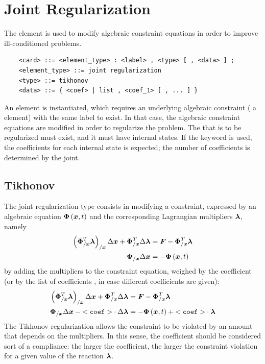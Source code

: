 \section{Joint Regularization}
The  element is used to modify
algebraic constraint equations in order to improve ill-conditioned
problems.

\begin{verbatim}
    <card> ::= <element_type> : <label> , <type> [ , <data> ] ;
    <element_type> ::= joint regularization
    <type> ::= tikhonov
    <data> ::= { <coef> | list , <coef_1> [ , ... ] }
\end{verbatim}
An element is instantiated, which requires
an underlying algebraic constraint ( a  element)
with the same label to exist.
In that case, the algebraic constraint equations are modified
in order to regularize the problem.
The  that is to be regularized must exist,
and it must have internal states.
If the keyword  is used, the coefficients for each internal state
is expected; the number of coefficients is determined by the joint.

\subsection{Tikhonov}
The  joint regularization type consists in modifying
a constraint, expressed by an algebraic equation $\boldsymbol{\Phi}\left( \boldsymbol{x}, t \right)$
and the corresponding Lagrangian multipliers $\boldsymbol{\lambda}$, namely
\begin{align}
	\left( \boldsymbol{\Phi}_{/\boldsymbol{x}}^T \boldsymbol{\lambda} \right)_{/\boldsymbol{x}} \Delta\boldsymbol{x}
	+ \boldsymbol{\Phi}_{/\boldsymbol{x}}^T \Delta\boldsymbol{\lambda}
		&= \boldsymbol{F} - \boldsymbol{\Phi}_{/\boldsymbol{x}}^T \boldsymbol{\lambda} \\
	\boldsymbol{\Phi}_{/\boldsymbol{x}} \Delta\boldsymbol{x} &= - \boldsymbol{\Phi}\left( \boldsymbol{x}, t \right)
\end{align}
by adding the multipliers to the constraint equation,
weighed by the coefficient  (or by the list of coefficients
, in case different coefficients are given):
\begin{align}
	\left( \boldsymbol{\Phi}_{/\boldsymbol{x}}^T \boldsymbol{\lambda} \right)_{/\boldsymbol{x}} \Delta\boldsymbol{x}
	+ \boldsymbol{\Phi}_{/\boldsymbol{x}}^T \Delta\boldsymbol{\lambda}
	&= \boldsymbol{F} - \boldsymbol{\Phi}_{/\boldsymbol{x}}^T \boldsymbol{\lambda} \\
	\boldsymbol{\Phi}_{/\boldsymbol{x}} \Delta\boldsymbol{x}
	- \mathtt{<coef>} \cdot \Delta\boldsymbol{\lambda}
	&= - \boldsymbol{\Phi}\left( \boldsymbol{x}, t \right) + \mathtt{<coef>} \cdot \boldsymbol{\lambda}
\end{align}
The Tikhonov regularization allows the constraint to be violated
by an amount that depends on the multipliers.
In this sense, the coefficient  should be considered
sort of a compliance: the larger the coefficient,
the larger the constraint violation for a given value
of the reaction $\boldsymbol{\lambda}$.

